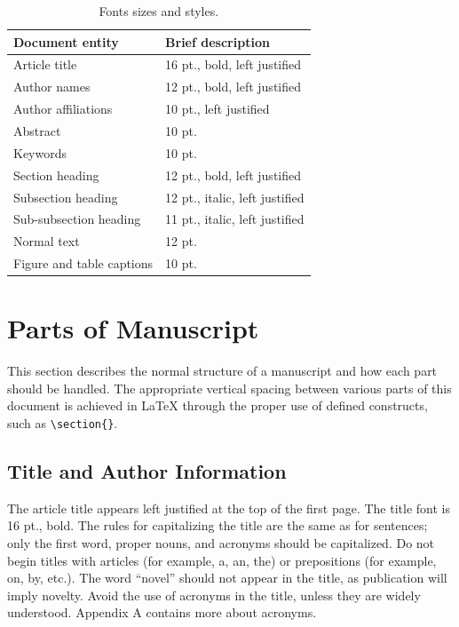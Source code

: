 \documentclass[12pt]{spieman}  %
\begin{document}
\begin{spacing}{2}
\begin{table}[ht]
\caption{Fonts sizes and styles.}
\label{tab:fonts}
\begin{center}
\begin{tabular}{|l|l|} %
\hline
\rule[-1ex]{0pt}{3.5ex}  Document entity & Brief description  \\
\hline\hline
\rule[-1ex]{0pt}{3.5ex}  Article title & 16 pt., bold, left justified  \\
\hline
\rule[-1ex]{0pt}{3.5ex}  Author names & 12 pt., bold, left justified   \\
\hline
\rule[-1ex]{0pt}{3.5ex}  Author affiliations & 10 pt., left justified   \\
\hline
\rule[-1ex]{0pt}{3.5ex}  Abstract & 10 pt.  \\
\hline
\rule[-1ex]{0pt}{3.5ex}  Keywords & 10 pt.  \\
\hline
\rule[-1ex]{0pt}{3.5ex}  Section heading & 12 pt., bold, left justified  \\
\hline
\rule[-1ex]{0pt}{3.5ex}  Subsection heading & 12 pt., italic, left justified  \\
\hline
\rule[-1ex]{0pt}{3.5ex}  Sub-subsection heading & 11 pt., italic, left justified  \\
\hline
\rule[-1ex]{0pt}{3.5ex}  Normal text & 12 pt. \\
\hline
\rule[-1ex]{0pt}{3.5ex}  Figure and table captions &  10 pt. \\
\hline
\end{tabular}
\end{center}
\end{table}

\section{Parts of Manuscript}

This section describes the normal structure of a manuscript and how each part should be handled. The appropriate vertical spacing between various parts of this document is achieved in LaTeX through the proper use of defined constructs, such as \verb|\section{}|.

\subsection{Title and Author Information}
\label{sect:title}
The article title appears left justified at the top of the first page. The title font is 16 pt., bold. The rules for capitalizing the title are the same as for sentences; only the first word, proper nouns, and acronyms should be capitalized. Do not begin titles with articles (for example, a, an, the) or prepositions (for example, on, by, etc.). The word ``novel'' should not appear in the title, as publication will imply novelty. Avoid the use of acronyms in the title, unless they are widely understood. Appendix A contains more about acronyms.


\end{spacing}
\end{document}
